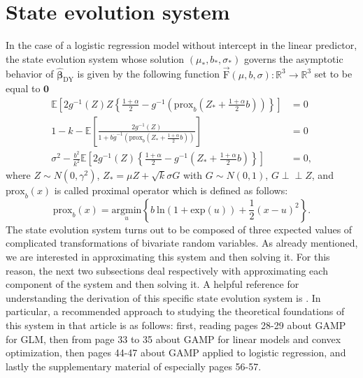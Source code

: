 \documentclass{article}
\begin{document}
\section{State evolution system}
In the case of a logistic regression model without intercept in the linear predictor, the state evolution system whose solution $(\mu_*,b_*,\sigma_*)$ governs the asymptotic behavior of $\hat{\boldsymbol{\beta}}_{\text{DY}}$ is given by the following function $\vec{\text{F}}(\mu,b,\sigma):\mathbb{R}^3\rightarrow\mathbb{R}^3$ set to be equal to $\mathbf{0}$
\begin{align*}
\mathbb{E}\left[2g^{-1}(Z)Z\left\{\frac{1+\alpha}{2}-g^{-1}\left(\text{prox}_{b}\left( Z_*+\frac{1+\alpha}{2}b\right)\right) \right\}\right] &= 0\\[10pt]
1-k-\mathbb{E}\left[\frac{2g^{-1}(Z)}{1+b\dot{g}^{-1}(\text{prox}_b(Z_*+\frac{1+\alpha}{2}b))}\right] &= 0\\[10pt]
\sigma^2-\frac{b^2}{k^2}\mathbb{E}\left[2g^{-1}(Z)\left\{\frac{1+\alpha}{2}-g^{-1}\left(Z_*+\frac{1+\alpha}{2}b\right)\right\} \right]&=0,
\end{align*}
where $Z\sim N(0,\gamma^2)$, $Z_*=\mu Z + \sqrt{k}\sigma G$ with $G\sim N(0,1)$, $G \perp\!\!\!\perp Z$, and $\text{prox}_{b}(x)$ is called proximal operator which is defined as follows:
\begin{equation*}
\text{prox}_{b}(x)=\underset{u}{\text{argmin}}\left\{b\ \text{ln}(1+\text{exp}(u))+\frac{1}{2}(x-u)^2\right\}.
\end{equation*}
The state evolution system turns out to be composed of three expected values of complicated transformations of bivariate random variables.
As already mentioned, we are interested in approximating this system and then solving it. For this reason, the next two subsections deal respectively with approximating each component of the system and then solving it. A helpful reference for understanding the derivation of this specific state evolution system is \citep{amptut}. In particular, a recommended approach to studying the theoretical foundations of this system in that article is as follows: first, reading pages 28-29 about GAMP for GLM, then from page 33 to 35 about GAMP for linear models and convex optimization, then pages 44-47 about GAMP applied to logistic regression, and lastly the supplementary material of \citep{DYkosmidis} especially pages 56-57.   
\end{document}
